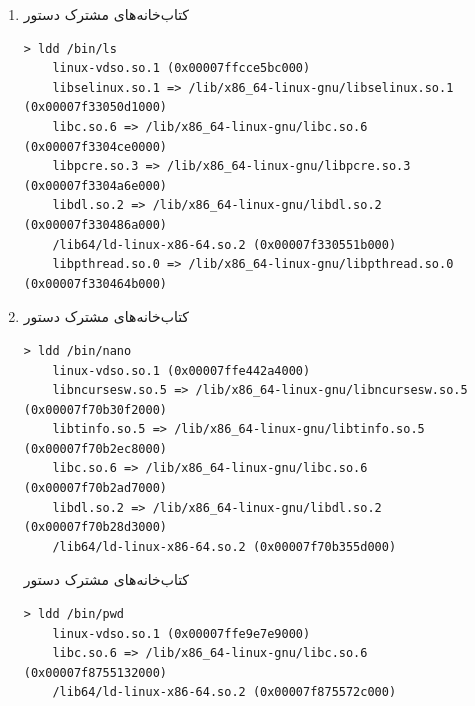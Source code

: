 \newpage


\begin{enumerate}
	\item کتاب‌خانه‌های مشترک دستور 
	\begin{Verbatim}[tabsize=4]
> ldd /bin/ls
	linux-vdso.so.1 (0x00007ffcce5bc000)
	libselinux.so.1 => /lib/x86_64-linux-gnu/libselinux.so.1 (0x00007f33050d1000)
	libc.so.6 => /lib/x86_64-linux-gnu/libc.so.6 (0x00007f3304ce0000)
	libpcre.so.3 => /lib/x86_64-linux-gnu/libpcre.so.3 (0x00007f3304a6e000)
	libdl.so.2 => /lib/x86_64-linux-gnu/libdl.so.2 (0x00007f330486a000)
	/lib64/ld-linux-x86-64.so.2 (0x00007f330551b000)
	libpthread.so.0 => /lib/x86_64-linux-gnu/libpthread.so.0 (0x00007f330464b000)
	\end{Verbatim}
	\item 
	کتاب‌خانه‌های مشترک دستور 
	\begin{Verbatim}[tabsize=4]
> ldd /bin/nano
	linux-vdso.so.1 (0x00007ffe442a4000)
	libncursesw.so.5 => /lib/x86_64-linux-gnu/libncursesw.so.5 (0x00007f70b30f2000)
	libtinfo.so.5 => /lib/x86_64-linux-gnu/libtinfo.so.5 (0x00007f70b2ec8000)
	libc.so.6 => /lib/x86_64-linux-gnu/libc.so.6 (0x00007f70b2ad7000)
	libdl.so.2 => /lib/x86_64-linux-gnu/libdl.so.2 (0x00007f70b28d3000)
	/lib64/ld-linux-x86-64.so.2 (0x00007f70b355d000)
	\end{Verbatim}
	کتاب‌خانه‌های مشترک دستور 
	\begin{Verbatim}[tabsize=4]
> ldd /bin/pwd
	linux-vdso.so.1 (0x00007ffe9e7e9000)
	libc.so.6 => /lib/x86_64-linux-gnu/libc.so.6 (0x00007f8755132000)
	/lib64/ld-linux-x86-64.so.2 (0x00007f875572c000)
	\end{Verbatim}
\end{enumerate}

\newpage
{}

